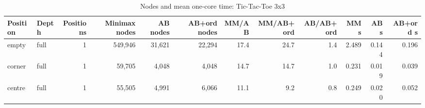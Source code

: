 \begin{table}[!t]
\centering
\caption{Nodes and mean one-core time: Tic-Tac-Toe 3x3}
\label{tab:nodes_ttt3}
\small
\begin{tabular}{llrrrrrrrrrr}
\toprule
Position & Depth & Positions & Minimax nodes & AB nodes & AB+ord nodes & MM/AB & MM/AB+ord & AB/AB+ord & MM s & AB s & AB+ord s \\
\midrule
empty & full & 1 & 549,946 & 31,621 & 22,294 & 17.4 & 24.7 & 1.4 & 2.489 & 0.144 & 0.196 \\
corner & full & 1 & 59,705 & 4,048 & 4,048 & 14.7 & 14.7 & 1.0 & 0.231 & 0.019 & 0.039 \\
centre & full & 1 & 55,505 & 4,991 & 6,066 & 11.1 & 9.2 & 0.8 & 0.249 & 0.020 & 0.052 \\
\bottomrule
\end{tabular}
\end{table}
